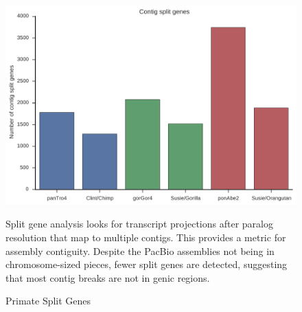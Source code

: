 \documentclass[fleqn,10pt]{wlscirep}
\begin{document}
\begin{figure}
\centering
\includegraphics[width=\textwidth,height=\textheight,keepaspectratio]{split_genes.pdf}
\caption{Primate Split Genes}
\label{supp_fig:primate_split_genes}
Split gene analysis looks for transcript projections after paralog resolution that map to multiple contigs. This provides a metric for assembly contiguity. Despite the PacBio assemblies not being in chromosome-sized pieces, fewer split genes are detected, suggesting that most contig breaks are not in genic regions.
\end{figure}
\end{document}

